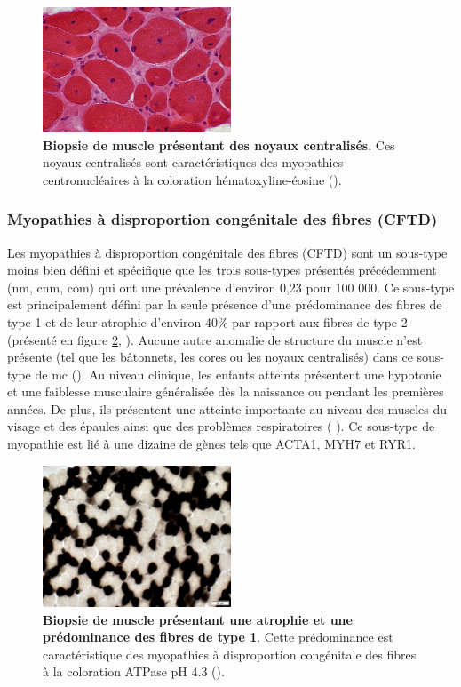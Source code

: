 \begin{figure}[!ht]
 \centering
 \includegraphics[width=0.5\textwidth]{figures/nuc.png}
 \caption[Biopsie de muscle de myopathie centronucléaire.]{\textbf{Biopsie de muscle présentant des noyaux centralisés}. Ces noyaux centralisés sont caractéristiques des myopathies centronucléaires à la coloration hématoxyline-éosine (\cite{alan_pestronk_neuromuscular_2022}).}
 \label{fig:nuc}
\end{figure}

\subsubsection{Myopathies à disproportion congénitale des fibres (CFTD)}
Les myopathies à disproportion congénitale des fibres (CFTD) sont un sous-type moins bien défini et spécifique que les trois sous-types présentés précédemment (\gls{nm}, \gls{cnm}, \gls{com}) qui ont une prévalence d'environ 0,23 pour 100 000. Ce sous-type est principalement défini par la seule présence d'une prédominance des fibres de type 1 et de leur atrophie d'environ 40\% par rapport aux fibres de type 2 (présenté en figure \ref{fig:cftd}, \cite{claeys_congenital_2020} ). Aucune autre anomalie de structure du muscle n'est présente (tel que les bâtonnets, les cores ou les noyaux centralisés) dans ce sous-type de \gls{mc} (\cite{claeys_congenital_2020}). Au niveau clinique, les enfants atteints présentent une hypotonie et une faiblesse musculaire généralisée dès la naissance ou pendant les premières années. De plus, ils présentent une atteinte importante au niveau des muscles du visage et des épaules ainsi que des problèmes respiratoires (\cite{claeys_congenital_2020} ). Ce sous-type de myopathie est lié à une dizaine de gènes tels que ACTA1, MYH7 et RYR1.
\begin{figure}[!ht]
 \centering
 \includegraphics[width=0.5\textwidth]{figures/cftd.jpg}
 \caption[Biopsie de muscle de myopathie à disproportion congénitale des fibres]{\textbf{Biopsie de muscle présentant une atrophie et une prédominance des fibres de type 1}. Cette prédominance est caractéristique des myopathies à disproportion congénitale des fibres à la coloration ATPase pH 4.3 (\cite{alan_pestronk_neuromuscular_2022}).}
 \label{fig:cftd}
\end{figure}
